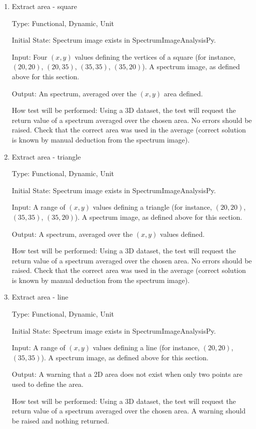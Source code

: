 \documentclass[12pt, titlepage]{article}
\newcommand{\progname}{SpectrumImageAnalysisPy}
\begin{document}
\begin{enumerate}

\item{Extract area - square}

Type: Functional, Dynamic, Unit

Initial State: Spectrum image exists in \progname{}.

Input: Four $(x,y)$ values defining the vertices of a square (for instance, $(20, 20)$, $(20, 35)$, $(35, 35)$, $(35, 20)$). A spectrum image, as defined above for this section.

Output: An spectrum, averaged over the $(x,y)$ area defined.

How test will be performed: Using a 3D dataset, the test will request the return value of a spectrum averaged over the chosen area. No errors should be raised. Check that the correct area was used in the average (correct solution is known by manual deduction from the spectrum image).

\item{Extract area - triangle}

Type: Functional, Dynamic, Unit

Initial State: Spectrum image exists in \progname{}.

Input: A range of $(x,y)$ values defining a triangle (for instance, $(20, 20)$, $(35, 35)$, $(35, 20)$). A spectrum image, as defined above for this section.

Output: A spectrum, averaged over the $(x,y)$ values defined.

How test will be performed: Using a 3D dataset, the test will request the return value of a spectrum averaged over the chosen area. No errors should be raised. Check that the correct area was used in the average (correct solution is known by manual deduction from the spectrum image).

\item{Extract area - line}

Type: Functional, Dynamic, Unit

Initial State: Spectrum image exists in \progname{}.

Input: A range of $(x,y)$ values defining a line (for instance, $(20, 20)$, $(35, 35)$). A spectrum image, as defined above for this section.

Output: A warning that a 2D area does not exist when only two points are used to define the area.

How test will be performed: Using a 3D dataset, the test will request the return value of a spectrum averaged over the chosen area. A warning should be raised and nothing returned.


\end{enumerate}
\end{document}
